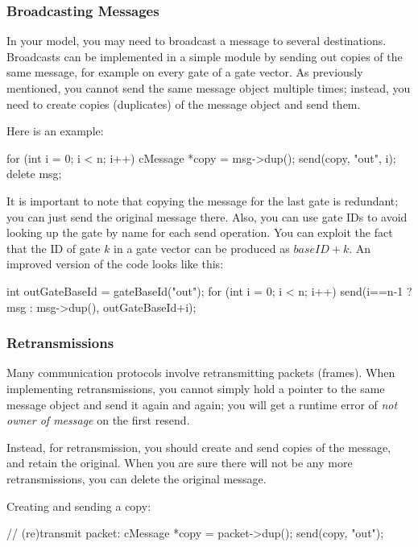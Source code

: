 \subsubsection{Broadcasting Messages}
\label{sec:simple-modules:broadcasting-messages}

In your model, you may need to broadcast a message to several destinations.
Broadcasts can be implemented in a simple module by sending out copies
of the same message, for example on every gate of a gate vector.
As previously mentioned, you cannot send the same message object multiple times;
instead, you need to create copies (duplicates) of the message object and send them.

Here is an example:

\begin{cpp}
for (int i = 0; i < n; i++) {
    cMessage *copy = msg->dup();
    send(copy, "out", i);
}
delete msg;
\end{cpp}

It is important to note that copying the message for the last gate is
redundant; you can just send the original message there.
Also, you can use gate IDs to avoid looking up the gate by name
for each send operation. You can exploit the fact that the ID of gate
$k$ in a gate vector can be produced as ${baseID} + k$.
An improved version of the code looks like this:

\begin{cpp}
int outGateBaseId = gateBaseId("out");
for (int i = 0; i < n; i++)
    send(i==n-1 ? msg : msg->dup(), outGateBaseId+i);
\end{cpp}


\subsubsection{Retransmissions}
\label{sec:simple-modules:retransmissions}

Many communication protocols involve retransmitting packets (frames).
When implementing retransmissions, you cannot simply hold a pointer
to the same message object and send it again and again; you will get
a runtime error of \textit{not owner of message} on the first resend.

Instead, for retransmission, you should create and
send copies of the message, and retain the original.
When you are sure there will not be any more retransmissions,
you can delete the original message.

Creating and sending a copy:

\begin{cpp}
// (re)transmit packet:
cMessage *copy = packet->dup();
send(copy, "out");
\end{cpp}

